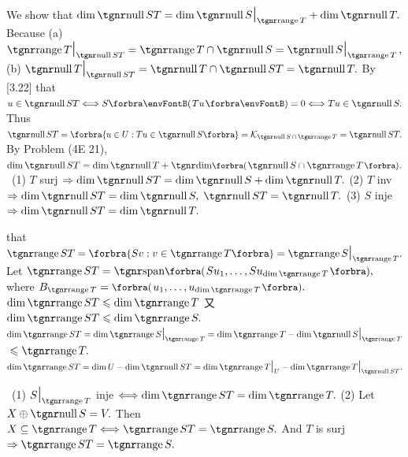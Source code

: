 We show that $\dim \null ST=\dim \null S\mmid_{\range T} + \dim \null T.$\parSol{}
Because (a) \uline{$\range T\mmid_{\null ST}=\range T\cap\null S=\null S\mmid_{\range T}\,,$}\parSol{}
 (b) \uline{$\null T\mmid_{\null ST}=\null T\cap\null ST=\null T.$} By [3.22]\PfEnd\parSol{\vspace{6pt}}
\Or \NOTICE that \uline{$u\in\null ST\Longleftrightarrow S\Par{Tu}=0\Longleftrightarrow Tu\in\null S.$}\parSol{}
\Blind{\Or}Thus \uline{$\null ST=\Bra{u\in U:Tu\in\null S}=\mathcal{K}_{\null S\,\cap\,\range T}=\null ST.$}\parSol{}
\Blind{\Or}By Problem (4E 21), $\dim\null ST=\dim\null T+\Dim\BigPar{\null S\cap\range T}.$\PfEnd\vspace{4pt}
\Corollary \,\,\,(1) $T$ surj $\Rightarrow\dim\null ST=\dim\null S+\dim\null T.$\parCor
(2) $T$ inv $\Rightarrow\dim\null ST=\dim\null S,\;\null ST=\null T.$\parCor
(3) $S$ inje $\Rightarrow\dim\null ST=\dim\null T.$\vspace{-3pt}
\SepLine

\NOTICE that \uline{$\range ST=\Bra{Sv:v\in\range T}=\range S\mmid_{\range T}.$}\parSol{}
Let $\range ST=\Span[\BigPar]{Su_1,\dots,Su_{\dim\range T}},$ where $B_{\range T}=\BigPar{u_1,\dots,u_{\dim\range T}}.$\parSol{}
$\dim\range ST\leqslant \dim\range T$
又 $\dim\range ST\leqslant \dim\range S.$\PfEnd\parSol{\vspace{4pt}}
\Or \uline{$\dim\range ST=\dim\range S\mmid_{\range T}=\dim\range T-\dim\null S\mmid_{\range T}$}${}\leqslant \range T.$\PfEnd\parSol{}
\Comment \,\,\,$\dim\range ST=\dim U-\dim\null ST=\dim \range T\mmid_{U}-\dim\range T\mmid_{\null ST}.$\par\vspace{4pt}
\Corollary \,\,\,(1) $S\mmid_{\range T}$ inje $\Longleftrightarrow\dim\range ST=\dim\range T.$\parCor
(2) Let $X\oplus\null S=V.$ Then $X\subseteq\range T\Longleftrightarrow\range ST=\range S.$\parCor
{} And $T$ is surj $\Rightarrow\range ST=\range S.$\vspace{-3pt}
\SepLine

